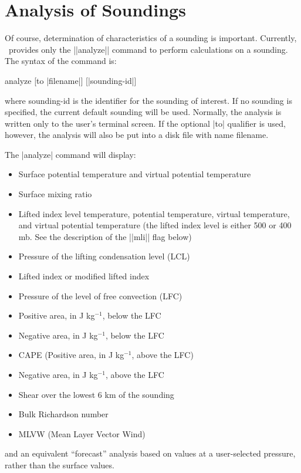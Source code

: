 \section{Analysis of Soundings}
Of course, determination of characteristics of a sounding is important.
Currently, \suds\ provides only the ||analyze|| command to perform calculations
on a sounding.  The syntax of the command is:
\begin{example}
	analyze [to |filename|] [|sounding-id|]
\end{example}
where {\pf sounding-id} is the identifier for the sounding of interest.  If no
sounding is specified, the current default sounding will be used.  
Normally, the analysis is written only to the user's terminal screen.  If
the optional |to| qualifier is used, however, the analysis will also be put 
into a disk file with name {\pf filename}.


The |analyze| command will display:
\begin{itemize}
	\parskip=0pt
	\item Surface potential temperature and virtual potential temperature
	\item Surface mixing ratio
	\item Lifted index level temperature, potential temperature, virtual 
		temperature, and virtual potential temperature (the lifted
		index level is either 500 or 400 mb.  See the description of 
		the ||mli|| flag below)
	\item Pressure of the lifting condensation level (LCL)
	\item Lifted index or modified lifted index
	\item Pressure of the level of free convection (LFC)
	\item Positive area, in J kg$^{-1}$, below the LFC
	\item Negative area, in J kg$^{-1}$, below the LFC
	\item CAPE (Positive area, in J kg$^{-1}$, above the LFC)
	\item Negative area, in J kg$^{-1}$, above the LFC
	\item Shear over the lowest 6 km of the sounding
	\item Bulk Richardson number
	\item MLVW (Mean Layer Vector Wind)
\end{itemize}
and an equivalent ``forecast'' analysis based on values at a user-selected
pressure, rather than the surface values.

